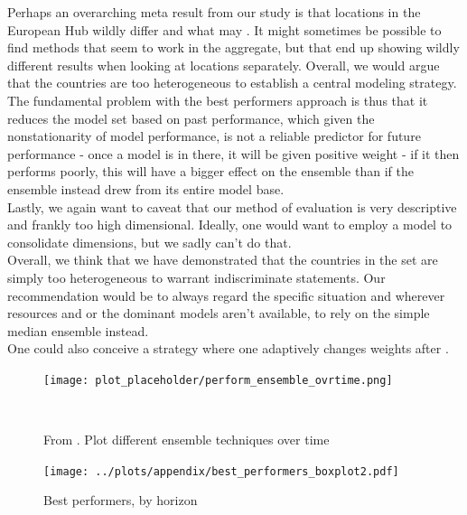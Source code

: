 Perhaps an overarching meta result from our study is that locations in the European Hub wildly differ and what may . It might sometimes be possible to find methods that seem to work in the aggregate, but that end up showing wildly different results when looking at locations separately. Overall, we would argue that the countries are too heterogeneous to establish a central modeling strategy.\\
The fundamental problem with the best performers approach is thus that it reduces the model set based on past performance, which given the nonstationarity of model performance, is not a reliable predictor for future performance - once a model is in there, it will be given positive weight - if it then performs poorly, this will have a bigger effect on the ensemble than if the ensemble instead drew from its entire model base.\\
Lastly, we again want to caveat that our method of evaluation is very descriptive and frankly too high dimensional. Ideally, one would want to employ a model to consolidate dimensions, but we sadly can't do that. \\
Overall, we think that we have demonstrated that the countries in the set are simply too heterogeneous to warrant indiscriminate statements. Our recommendation would be to always regard the specific situation and wherever resources and or the dominant models aren't available, to rely on the simple median ensemble instead.\\
One could also conceive a strategy where one adaptively changes weights after .\\
\begin{figure}
\centering
\texttt{[image: plot\_placeholder/perform\_ensemble\_ovrtime.png]}
\caption{From \cite{ray_ensemble_2020}. Plot different ensemble techniques over time}
\
\end{figure}



\appendix
\begin{figure}
\centering
\texttt{[image: ../plots/appendix/best\_performers\_boxplot2.pdf]}
\caption{Best performers, by horizon}
\label{fig:best_performers_by_horizon}
\end{figure}


